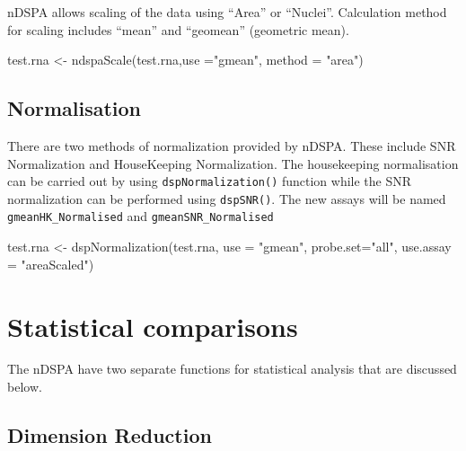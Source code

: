 \documentclass[]{article}
\newcommand{\hlstr}[1]{\textcolor[rgb]{0.251,0.627,0.251}{#1}}%
\newcommand{\hlstd}[1]{\textcolor[rgb]{0.251,0.251,0.251}{#1}}%
\newenvironment{Shaded}{\begin{myshaded}}{\end{myshaded}}
\newcommand{\StringTok}[1]{\hlstr{#1}}
\newcommand{\OtherTok}[1]{{#1}}
\newcommand{\FunctionTok}[1]{\hlstd{#1}}
\newcommand{\AttributeTok}[1]{{#1}}
\newcommand{\NormalTok}[1]{\hlstd{#1}}
\begin{document}
nDSPA allows scaling of the data using ``Area'' or ``Nuclei''. Calculation method
for scaling includes ``mean'' and ``geomean'' (geometric mean).

\begin{Shaded}
\begin{Highlighting}[]
\NormalTok{test.rna }\OtherTok{\textless{}{-}} \FunctionTok{ndspaScale}\NormalTok{(test.rna,}\AttributeTok{use =}\StringTok{"gmean"}\NormalTok{, }\AttributeTok{method =} \StringTok{"area"}\NormalTok{)}
\end{Highlighting}
\end{Shaded}

\hypertarget{normalisation}{%
\subsection{Normalisation}\label{normalisation}}

There are two methods of normalization provided by nDSPA. These include SNR
Normalization and HouseKeeping Normalization. The housekeeping normalisation can
be carried out by using \texttt{dspNormalization()} function while the SNR
normalization can be performed using \texttt{dspSNR()}. The new assays will be named \texttt{gmeanHK\_Normalised} and \texttt{gmeanSNR\_Normalised}

\begin{Shaded}
\begin{Highlighting}[]
\NormalTok{test.rna }\OtherTok{\textless{}{-}} \FunctionTok{dspNormalization}\NormalTok{(test.rna, }\AttributeTok{use =} \StringTok{"gmean"}\NormalTok{, }\AttributeTok{probe.set=}\StringTok{"all"}\NormalTok{, }
                             \AttributeTok{use.assay =} \StringTok{"areaScaled"}\NormalTok{)}
\end{Highlighting}
\end{Shaded}

\hypertarget{statistical-comparisons}{%
\section{Statistical comparisons}\label{statistical-comparisons}}

The nDSPA have two separate functions for statistical analysis that are
discussed below.

\hypertarget{dimension-reduction}{%
\subsection{Dimension Reduction}\label{dimension-reduction}}
\end{document}
